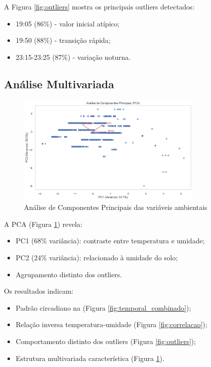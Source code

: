 \documentclass[12pt, a4paper]{article}
\begin{document}
A Figura \ref{fig:outliers} mostra os principais outliers detectados:
\begin{itemize}
    \item 19:05 (86\%) - valor inicial atípico;
    \item 19:50 (88\%) - transição rápida;
    \item 23:15-23:25 (87\%) - variação noturna.
\end{itemize}

\subsection{Análise Multivariada}
\begin{figure}[h]
\centering
\includegraphics[width=0.8\textwidth]{graficos/pca_ambiental.png}
\caption{Análise de Componentes Principais das variáveis ambientais}
\label{fig:pca}
\end{figure}

A PCA (Figura \ref{fig:pca}) revela:
\begin{itemize}
    \item PC1 (68\% variância): contraste entre temperatura e umidade;
    \item PC2 (24\% variância): relacionado à umidade do solo;
    \item Agrupamento distinto dos outliers.
\end{itemize}

Os resultados indicam:
\begin{itemize}
    \item Padrão circadiano na (Figura \ref{fig:temporal_combinado});
    \item Relação inversa temperatura-umidade (Figura \ref{fig:correlacao});
    \item Comportamento distinto dos outliers (Figura \ref{fig:outliers});
    \item Estrutura multivariada característica (Figura \ref{fig:pca}).
\end{itemize}
\end{document}
